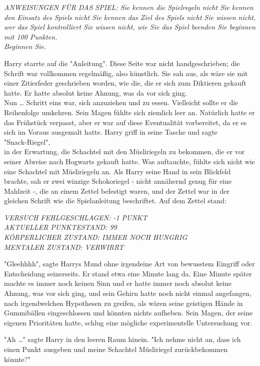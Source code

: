 {\emph{ANWEISUNGEN FÜR DAS SPIEL: Sie kennen die Spielregeln nicht Sie kennen den Einsatz des Spiels nicht Sie kennen das Ziel des Spiels nicht Sie wissen nicht, wer das Spiel kontrolliert Sie wissen nicht, wie Sie das Spiel beenden Sie beginnen mit 100 Punkten.}\\ \emph{Beginnen Sie.}

Harry starrte auf die "Anleitung". Diese Seite war nicht handgeschrieben; die Schrift war vollkommen regelmäßig, also künstlich. Sie sah aus, als wäre sie mit einer Zitierfeder geschrieben worden, wie die, die er sich zum Diktieren gekauft hatte. Er hatte absolut keine Ahnung, was da vor sich ging.\\ Nun … Schritt eins war, sich anzuziehen und zu essen. Vielleicht sollte er die Reihenfolge umkehren. Sein Magen fühlte sich ziemlich leer an. Natürlich hatte er das Frühstück verpasst, aber er war auf diese Eventualität vorbereitet, da er es sich im Voraus ausgemalt hatte. Harry griff in seine Tasche und sagte\\ "Snack-Riegel",\\ in der Erwartung, die Schachtel mit den Müsliriegeln zu bekommen, die er vor seiner Abreise nach Hogwarts gekauft hatte. Was auftauchte, fühlte sich nicht wie eine Schachtel mit Müsliriegeln an. Als Harry seine Hand in sein Blickfeld brachte, sah er zwei winzige Schokoriegel - nicht annähernd genug für eine Mahlzeit -, die an einem Zettel befestigt waren, und der Zettel war in der gleichen Schrift wie die Spielanleitung beschriftet. Auf dem Zettel stand:

\emph{VERSUCH FEHLGESCHLAGEN: -1 PUNKT}\\ \emph{AKTUELLER PUNKTESTAND: 99}\\ \emph{KÖRPERLICHER ZUSTAND: IMMER NOCH HUNGRIG}\\ \emph{MENTALER ZUSTAND: VERWIRRT}

"Gleehhhh", sagte Harrys Mund ohne irgendeine Art von bewusstem Eingriff oder Entscheidung seinerseits. Er stand etwa eine Minute lang da. Eine Minute später machte es immer noch keinen Sinn und er hatte immer noch absolut keine Ahnung, was vor sich ging, und sein Gehirn hatte noch nicht einmal angefangen, nach irgendwelchen Hypothesen zu greifen, als wären seine geistigen Hände in Gummibällen eingeschlossen und könnten nichts aufheben. Sein Magen, der seine eigenen Prioritäten hatte, schlug eine mögliche experimentelle Untersuchung vor.

"Ah …" sagte Harry in den leeren Raum hinein. "Ich nehme nicht an, dass ich einen Punkt ausgeben und meine Schachtel Müsliriegel zurückbekommen könnte?"

}
